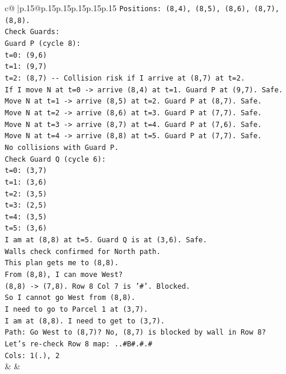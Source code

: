 \documentclass{article}
\begin{document}
{\begin{supertabular}{c@{$\;$}|p{.15\linewidth}@{}p{.15\linewidth}p{.15\linewidth}p{.15\linewidth}p{.15\linewidth}p{.15\linewidth}}
{{{\texttt{Positions: (8,4), (8,5), (8,6), (8,7), (8,8).} \\
\texttt{Check Guards:} \\
\texttt{Guard P (cycle 8):} \\
\texttt{t=0: (9,6)} \\
\texttt{t=1: (9,7)} \\
\texttt{t=2: (8,7) {-}{-} Collision risk if I arrive at (8,7) at t=2.} \\
\texttt{If I move N at t=0 {-}> arrive (8,4) at t=1. Guard P at (9,7). Safe.} \\
\texttt{Move N at t=1 {-}> arrive (8,5) at t=2. Guard P at (8,7). Safe.} \\
\texttt{Move N at t=2 {-}> arrive (8,6) at t=3. Guard P at (7,7). Safe.} \\
\texttt{Move N at t=3 {-}> arrive (8,7) at t=4. Guard P at (7,6). Safe.} \\
\texttt{Move N at t=4 {-}> arrive (8,8) at t=5. Guard P at (7,7). Safe.} \\
\texttt{No collisions with Guard P.} \\
\texttt{Check Guard Q (cycle 6):} \\
\texttt{t=0: (3,7)} \\
\texttt{t=1: (3,6)} \\
\texttt{t=2: (3,5)} \\
\texttt{t=3: (2,5)} \\
\texttt{t=4: (3,5)} \\
\texttt{t=5: (3,6)} \\
\texttt{I am at (8,8) at t=5. Guard Q is at (3,6). Safe.} \\
\texttt{Walls check confirmed for North path.} \\
\texttt{This plan gets me to (8,8).} \\
\texttt{From (8,8), I can move West?} \\
\texttt{(8,8) {-}> (7,8). Row 8 Col 7 is '\#'. Blocked.} \\
\texttt{So I cannot go West from (8,8).} \\
\texttt{I need to go to Parcel 1 at (3,7).} \\
\texttt{I am at (8,8). I need to get to (3,7).} \\
\texttt{Path: Go West to (8,7)? No, (8,7) is blocked by wall in Row 8?} \\
\texttt{Let's re{-}check Row 8 map: ..\#B\#.\#.\#} \\
\texttt{Cols: 1(.), 2} \\
            }
        }
    }
    & & \\ \\


\end{supertabular}}
\end{document}
